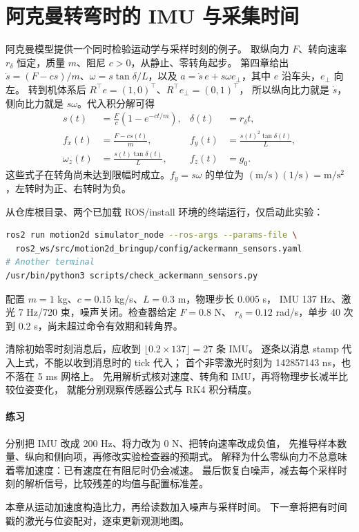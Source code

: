 \section{阿克曼转弯时的 IMU 与采集时间}
阿克曼模型提供一个同时检验运动学与采样时刻的例子。
取纵向力 $F$、转向速率 $r_\delta$ 恒定，质量 $m$、阻尼 $c>0$，从静止、零转角起步。
第四章给出 $\dot s=(F-cs)/m$、$\omega=s\tan\delta/L$，以及
$a=\dot s\,e+s\omega e_\perp$，其中 $e$ 沿车头，$e_\perp$ 向左。
转到机体系后 $R^\top e=(1,0)^\top$、$R^\top e_\perp=(0,1)^\top$，
所以纵向比力就是 $\dot s$，侧向比力就是 $s\omega$。代入积分解可得
\begin{align}
 s(t)&=\frac{F}{c}\left(1-e^{-ct/m}\right), & \delta(t)&=r_\delta t,\\
 f_x(t)&=\frac{F-cs(t)}m, &
 f_y(t)&=\frac{s(t)^2\tan\delta(t)}L,\\
 \omega_z(t)&=\frac{s(t)\tan\delta(t)}L, & f_z(t)&=g_0.
\end{align}
这些式子在转角尚未达到限幅时成立。$f_y=s\omega$ 的单位为
$(\mathrm{m/s})(1/\mathrm{s})=\mathrm{m/s^2}$，左转时为正、右转时为负。

从仓库根目录、两个已加载 ROS/install 环境的终端运行，仅启动此实验：
\begin{lstlisting}[language=bash,numbers=none]
ros2 run motion2d simulator_node --ros-args --params-file \
  ros2_ws/src/motion2d_bringup/config/ackermann_sensors.yaml
# Another terminal
/usr/bin/python3 scripts/check_ackermann_sensors.py
\end{lstlisting}
配置 $m=1$ kg、$c=0.15$ kg/s、$L=0.3$ m，物理步长 0.005 s，
IMU 137 Hz、激光 7 Hz/720 束，噪声关闭。检查器给定 $F=0.8$ N、
$r_\delta=0.12$ rad/s，单步 40 次到 0.2 s，尚未超过命令有效期和转角界。

清除初始零时刻消息后，应收到 $\lfloor0.2\times137\rfloor=27$ 条 IMU。
逐条以消息 stamp 代入上式，不能以收到消息时的 tick 代入；
首个非零激光时刻为 142857143 ns，也不落在 5 ms 网格上。
先用解析式核对速度、转角和 IMU，再将物理步长减半比较位姿变化，
就能分别观察传感器公式与 RK4 积分精度。

\paragraph{练习}
分别把 IMU 改成 200 Hz、将力改为 0 N、把转向速率改成负值，
先推导样本数量、纵向和侧向项，再修改实验检查器的预期式。
解释为什么零纵向力不总意味着零加速度：已有速度在有阻尼时仍会减速。
最后恢复白噪声，减去每个采样时刻的解析信号，比较残差的均值与配置标准差。

本章从运动加速度构造比力，再给读数加入噪声与采样时间。
下一章将把有时间戳的激光与位姿配对，逐束更新观测地图。
